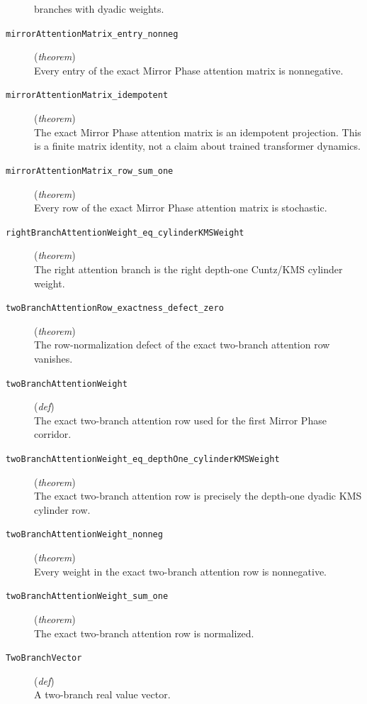 \documentclass[11pt,a4paper]{article}
\begin{document}
\begin{description}
branches with dyadic weights.
  \item[\texttt{mirrorAttentionMatrix\_entry\_nonneg}] (\textit{theorem}) \\ Every entry of the exact Mirror Phase attention matrix is nonnegative.
  \item[\texttt{mirrorAttentionMatrix\_idempotent}] (\textit{theorem}) \\ The exact Mirror Phase attention matrix is an idempotent projection.  This is a 
finite matrix identity, not a claim about trained transformer dynamics.
  \item[\texttt{mirrorAttentionMatrix\_row\_sum\_one}] (\textit{theorem}) \\ Every row of the exact Mirror Phase attention matrix is stochastic.
  \item[\texttt{rightBranchAttentionWeight\_eq\_cylinderKMSWeight}] (\textit{theorem}) \\ The right attention branch is the right depth-one Cuntz/KMS cylinder weight.
  \item[\texttt{twoBranchAttentionRow\_exactness\_defect\_zero}] (\textit{theorem}) \\ The row-normalization defect of the exact two-branch attention row vanishes.
  \item[\texttt{twoBranchAttentionWeight}] (\textit{def}) \\ The exact two-branch attention row used for the first Mirror Phase corridor.
  \item[\texttt{twoBranchAttentionWeight\_eq\_depthOne\_cylinderKMSWeight}] (\textit{theorem}) \\ The exact two-branch attention row is precisely the depth-one dyadic KMS 
cylinder row.
  \item[\texttt{twoBranchAttentionWeight\_nonneg}] (\textit{theorem}) \\ Every weight in the exact two-branch attention row is nonnegative.
  \item[\texttt{twoBranchAttentionWeight\_sum\_one}] (\textit{theorem}) \\ The exact two-branch attention row is normalized.
  \item[\texttt{TwoBranchVector}] (\textit{def}) \\ A two-branch real value vector.
\end{description}
\end{document}
